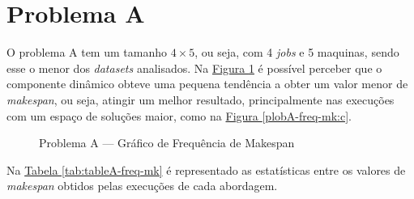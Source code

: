\section{Problema A}
O problema A tem um tamanho $4 \times 5$, ou seja, com 4 \textit{jobs} e 5 maquinas, sendo esse o menor dos \textit{datasets} analisados.
Na \hyperref[fig:plobA-freq-mk]{Figura \ref{fig:plobA-freq-mk}} é possível perceber que o componente dinâmico obteve uma pequena tendência a obter um valor menor de \textit{makespan}, ou seja, atingir um melhor resultado, principalmente nas execuções com um espaço de soluções maior, como na \hyperref[plobA-freq-mk:c]{Figura \ref{plobA-freq-mk:c}}.
\begin{figure}[!htb]
    \caption{Problema A — Gráfico de Frequência de Makespan}
    \label{fig:plobA-freq-mk}
    \begin{minipage}{.5\linewidth}
        \centering
        \subfloat[]{
            \label{plobA-freq-mk:a}
            \resizebox{\linewidth}{!}{}
        }
    \end{minipage}%
    \begin{minipage}{.5\linewidth}
        \centering
        \subfloat[]{
            \label{plobA-freq-mk:b}
            \resizebox{\linewidth}{!}{}
        }
    \end{minipage}\par\medskip
      \centering
      \subfloat[]{
        \label{plobA-freq-mk:c}
        \resizebox{.5\linewidth}{!}{}
      }
\end{figure}
Na
\hyperref[tab:tableA-freq-mk]{Tabela \ref{tab:tableA-freq-mk}}
é representado as estatísticas entre os valores de \textit{makespan} obtidos pelas execuções de cada abordagem.
